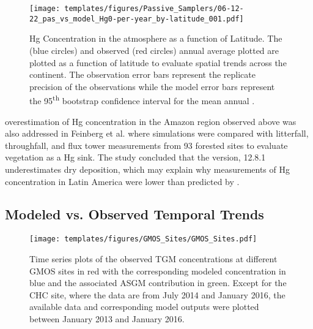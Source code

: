\begin{figure}[H]
  \texttt{[image: templates/figures/Passive\_Samplers/06-12-22\_pas\_vs\_model\_Hg0-per-year\_by-latitude\_001.pdf]}
  \caption[Hg Concentration in the atmosphere as a function of Latitude.]{Hg Concentration in the atmosphere as a function of Latitude. The \on (blue circles) and observed (red circles) annual average \hg plotted are plotted as a function of latitude to evaluate spatial trends across the continent. The observation error bars represent the replicate precision of the observations while the model error bars represent the 95\textsuperscript{th} bootstrap confidence interval for the mean annual \hg.}
  \label{fig:06-12-22_pas_vs_model_Hg0-per-year_by-latitude_001}
  \centering
  
\end{figure}
\FloatBarrier
\begin{flushleft}
    \gcs overestimation of Hg concentration in the Amazon region observed above was also addressed in Feinberg et al.\cite{feinberg_evaluating_2022}  where \gc simulations were compared with litterfall, throughfall, and flux tower measurements from 93 forested sites to evaluate vegetation as a Hg sink. The study concluded that the \gc version, 12.8.1 underestimates \hg dry deposition, which may explain why measurements of Hg concentration in Latin America were lower than predicted by \gc. 

\end{flushleft}


\subsection{Modeled vs. Observed Temporal Trends}\label{c2_modeled_vs_observed_trends}
\begin{figure}[H]
\texttt{[image: templates/figures/GMOS\_Sites/GMOS\_Sites.pdf]}
\centering
\caption[Time series plots of the observed TGM concentrations at different GMOS sites.]{Time series plots of the observed TGM concentrations at different GMOS sites in red with the corresponding modeled concentration in blue and the associated ASGM contribution in green. Except for the CHC site, where the data are from July 2014 and January 2016, the available data and corresponding model outputs were plotted between January 2013 and January 2016.}
\label{fig:GMOSvsGC}
\end{figure}
\FloatBarrier


